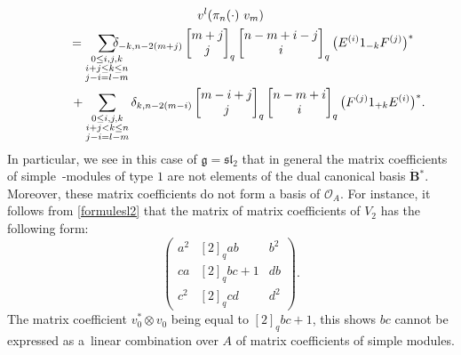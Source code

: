 \documentclass[pdftex]{sigma}
\numberwithin{equation}{section}
\theoremstyle{definition}
\newcommand{\Oo}{{\mathcal O}}
\begin{document}
\begin{gather}
v^l(\pi_n( \cdot) \ v_m)\nonumber\\
\qquad= \sum_{\substack{0\leq i,j,k\\ i+j\leq k\leq n\\j-i=l-m}} \hspace*{-0.5cm}\delta_{-k,n-2(m+j)} \left[\begin{matrix} m+j \\ j \end{matrix}\right]_{q} \left[\begin{matrix}n-m+i-j \\ i \end{matrix}\right]_{q}\big(E^{(i)}1_{-k}F^{(j)}\big)^*\nonumber\\
\phantom{\qquad=}{} + \sum_{\substack{0\leq i,j,k\\ i+j< k\leq n
\\j-i=l-m}}\delta_{k,n-2(m-i)} \left[\begin{matrix} m-i+j \\ j \end{matrix}\right]_{q} \left[\begin{matrix} n-m+i \\ i \end{matrix}\right]_{q}\big(F^{(j)}1_{+k}E^{(i)}\big)^*.\label{formulesl2}
\end{gather}
In particular, we see in this case of $\mathfrak{g}={\mathfrak{sl}_2}$ that in general the matrix coefficients of simple~-modules of type $1$ are not elements of the dual canonical basis $\dot{\mathbf{B}} {}^*$. Moreover, these matrix coefficients do not form a basis of $\Oo_A$. For instance, it follows from \eqref{formulesl2} that the matrix of matrix coefficients of $V_2$ has the following form:
\begin{equation}\label{matrixcoefV2}
\begin{pmatrix}a^2 & [2]_qab & b^2 \\ ca & [2]_qbc +1 & db \\ c^2 & [2]_q cd & d^2 \end{pmatrix}.
\end{equation}
The matrix coefficient $v_0^* \otimes v_0$ being equal to $[2]_qbc +1$, this shows $bc$ cannot be expressed as a~linear combination over $A$ of matrix coefficients of simple modules.
\end{document}
